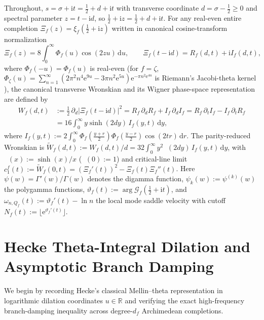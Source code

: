 \documentclass[11pt,reqno]{amsart}
\theoremstyle{definition}
\theoremstyle{remark}
\numberwithin{equation}{section}
\newcommand{\R}{\mathbb{R}}
\newcommand{\dd}{\mathrm{d}}
\newcommand{\ii}{\mathrm{i}}
\newcommand{\ee}{\mathrm{e}}
\DeclareMathOperator{\sinchyp}{sinc_{hyp}}
\begin{document}
Throughout, $s = \sigma + \ii t = \frac{1}{2} + d + \ii t$ with transverse coordinate $d = \sigma - \frac{1}{2} \ge 0$ and spectral parameter $z = t - \ii d$, so $\frac{1}{2} + \ii z = \frac{1}{2} + d + \ii t$. For any real-even entire completion $\Xi_f(z) = \xi_f(\frac{1}{2}+\ii z)$ written in canonical cosine-transform normalization
\begin{equation}
  \Xi_f(z) = 8 \int_{0}^{\infty} \Phi_f(u)\cos(2zu)\,\dd u,
  \qquad
  \Xi_f(t - \ii d) = R_f(d,t) + \ii I_f(d,t),
  \label{eq:canonical-xi}
\end{equation}
where $\Phi_f(-u) = \Phi_f(u)$ is real-even (for $f=\zeta$, $\Phi_\zeta(u) = \sum_{n=1}^{\infty}(2\pi^2 n^4 \ee^{9u} - 3\pi n^2 \ee^{5u})\ee^{-\pi n^2 \ee^{4u}}$ is Riemann's Jacobi-theta kernel \cite{riemann1859,polya1926}), the canonical transverse Wronskian and its Wigner phase-space representation \cite{wigner1932,hudson1974} are defined by
\begin{align}
  W_f(d,t) &:= \frac{1}{2}\,\partial_d\bigl|\Xi_f(t - \ii d)\bigr|^2
  = R_f\,\partial_d R_f + I_f\,\partial_d I_f
  = R_f\,\partial_t I_f - I_f\,\partial_t R_f \nonumber\\
  &= 16 \int_{0}^{\infty} y\sinh(2dy)\,I_f(y,t)\,\dd y,
  \label{eq:canonical-wronskian}
\end{align}
where $I_f(y,t) := 2\int_{0}^{\infty}\Phi_f\!\left(\frac{y+r}{2}\right)\Phi_f\!\left(\frac{y-r}{2}\right)\cos(2tr)\,\dd r$. The parity-reduced Wronskian is $\widetilde{W}_f(d,t) := W_f(d,t)/d = 32\int_{0}^{\infty}y^2\sinchyp(2dy)\,I_f(y,t)\,\dd y$, with $\sinchyp(x) := \sinh(x)/x$ ($\sinchyp(0):=1$) and critical-line limit $c_1^f(t) := \widetilde{W}_f(0,t) = (\Xi_f'(t))^2 - \Xi_f(t)\Xi_f''(t)$. Here $\psi(w) = \Gamma'(w)/\Gamma(w)$ denotes the digamma function, $\psi_k(w) := \psi^{(k)}(w)$ the polygamma functions, $\vartheta_f(t) := \arg\mathcal{G}_f(\frac{1}{2}+\ii t)$, and $\omega_{n,Q_f}(t) := \vartheta_f'(t) - \ln n$ the local mode saddle velocity with cutoff $N_f(t) := \lfloor \ee^{\vartheta_f'(t)} \rfloor$.

\section{Hecke Theta-Integral Dilation and Asymptotic Branch Damping}
\label{sec:wavelet}

We begin by recording Hecke's classical Mellin--theta representation \cite{hecke1936} in logarithmic dilation coordinates $u \in \R$ and verifying the exact high-frequency branch-damping inequality across degree-$d_f$ Archimedean completions.
\end{document}

